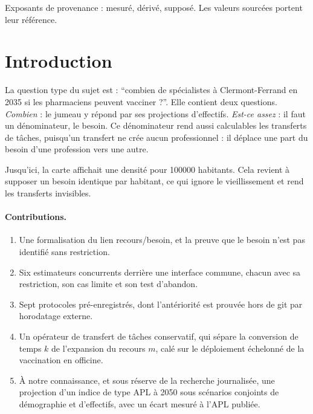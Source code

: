 \documentclass[11pt]{article}
\begin{document}
\noindent\small Exposants de provenance : \mesure{} mesuré, \derive{} dérivé, \suppose{} supposé. Les valeurs
sourcées portent leur référence.\normalsize

\section{Introduction}
La question type du sujet est : \enquote{combien de spécialistes à Clermont-Ferrand en 2035 si les pharmaciens peuvent
vacciner ?}. Elle contient deux questions. \emph{Combien} : le jumeau y répond par ses projections d'effectifs.
\emph{Est-ce assez} : il faut un dénominateur, le besoin. Ce dénominateur rend aussi calculables les transferts de
tâches, puisqu'un transfert ne crée aucun professionnel : il déplace une part du besoin d'une profession vers une
autre.

Jusqu'ici, la carte affichait une densité pour \num{100000} habitants. Cela revient à supposer un besoin identique par
habitant, ce qui ignore le vieillissement et rend les transferts invisibles.

\paragraph{Contributions.}
\begin{enumerate}
  \item Une formalisation du lien recours/besoin, et la preuve que le besoin n'est pas identifié sans restriction.
  \item Six estimateurs concurrents derrière une interface commune, chacun avec sa restriction, son cas limite et son
        test d'abandon.
  \item Sept protocoles pré-enregistrés, dont l'antériorité est prouvée hors de git par horodatage externe.
  \item Un opérateur de transfert de tâches conservatif, qui sépare la conversion de temps $k$ de l'expansion du
        recours $m$, calé sur le déploiement échelonné de la vaccination en officine.
  \item À notre connaissance, et sous réserve de la recherche journalisée, une projection d'un indice de type APL à
        2050 sous scénarios conjoints de démographie et d'effectifs, avec un écart mesuré à l'APL publiée.
\end{enumerate}

\end{document}
